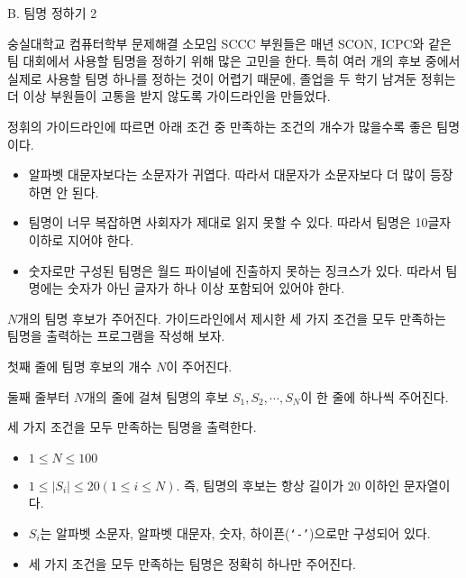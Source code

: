 \def\probtitle{팀명 정하기 2}
\def\probno{B} %

\begin{problem}{\probno{}. \probtitle{}}



숭실대학교 컴퓨터학부 문제해결 소모임 SCCC 부원들은 매년 SCON, ICPC와 같은 팀 대회에서 사용할 팀명을 정하기 위해 많은 고민을 한다. 특히 여러 개의 후보 중에서 실제로 사용할 팀명 하나를 정하는 것이 어렵기 때문에, 졸업을 두 학기 남겨둔 정휘는 더 이상 부원들이 고통을 받지 않도록 가이드라인을 만들었다.

정휘의 가이드라인에 따르면 아래 조건 중 만족하는 조건의 개수가 많을수록 좋은 팀명이다.

\begin{itemize}[topsep=0pt,noitemsep]
    \item 알파벳 대문자보다는 소문자가 귀엽다. 따라서 대문자가 소문자보다 더 많이 등장하면 안 된다.
    \item 팀명이 너무 복잡하면 사회자가 제대로 읽지 못할 수 있다. 따라서 팀명은 10글자 이하로 지어야 한다.
    \item 숫자로만 구성된 팀명은 월드 파이널에 진출하지 못하는 징크스가 있다. 따라서 팀명에는 숫자가 아닌 글자가 하나 이상 포함되어 있어야 한다.
\end{itemize}

$N$개의 팀명 후보가 주어진다. 가이드라인에서 제시한 세 가지 조건을 모두 만족하는 팀명을 출력하는 프로그램을 작성해 보자.

\InputFile

첫째 줄에 팀명 후보의 개수 $N$이 주어진다.

둘째 줄부터 $N$개의 줄에 걸쳐 팀명의 후보 $S_1, S_2, \cdots, S_N$이 한 줄에 하나씩 주어진다.

\OutputFile

세 가지 조건을 모두 만족하는 팀명을 출력한다.

\Constraints

\begin{itemize}[topsep=0pt,noitemsep]
    \item $1 \le N \le 100$
    \item $1 \le |S_i| \le 20 (1 \le i \le N)$. 즉, 팀명의 후보는 항상 길이가 $20$ 이하인 문자열이다.
    \item $S_i$는 알파벳 소문자, 알파벳 대문자, 숫자, 하이픈(\texttt{‘-’})으로만 구성되어 있다.
    \item 세 가지 조건을 모두 만족하는 팀명은 정확히 하나만 주어진다.
\end{itemize}


\end{problem}
